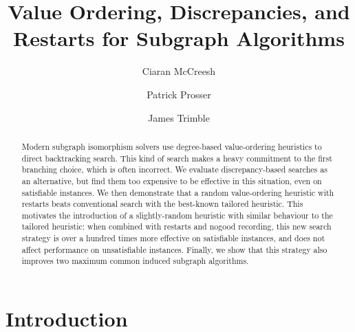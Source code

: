 \documentclass[a4paper,UKenglish]{lipics-v2018}
\title{Value Ordering, Discrepancies, and Restarts for Subgraph Algorithms}
\author{Ciaran McCreesh}{University of Glasgow}{ciaran.mccreesh@glasgow.ac.uk}{}{}
\author{Patrick Prosser}{University of Glasgow}{patrick.prosser@glasgow.ac.uk}{}{}
\author{James Trimble}{University of Glasgow}{j.trimble.1@research.gla.ac.uk}{}{}
\begin{document}
\maketitle

\begin{abstract}
    Modern subgraph isomorphism solvers use degree-based value-ordering heuristics to direct
    backtracking search. This kind of search makes a heavy commitment to the first branching choice,
    which is often incorrect. We evaluate discrepancy-based searches as an alternative, but find
    them too expensive to be effective in this situation, even on satisfiable instances. We then
    demonstrate that a random value-ordering heuristic with restarts beats conventional search with
    the best-known tailored heuristic. This motivates the introduction of a slightly-random
    heuristic with similar behaviour to the tailored heuristic: when combined with restarts and
    nogood recording, this new search strategy is over a hundred times more effective on satisfiable
    instances, and does not affect performance on unsatisfiable instances.  Finally, we show that
    this strategy also improves two maximum common induced subgraph algorithms.
\end{abstract}

\section{Introduction}
\end{document}
